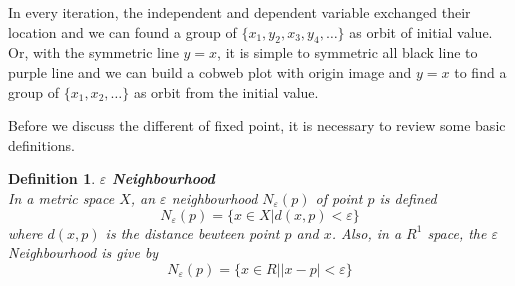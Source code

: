 \documentclass[12pt]{article}
\theoremstyle{plain}
\newtheorem{definition}{\textbf{Definition}}[section]
\begin{document}
In every iteration, the independent and dependent variable exchanged their location and we can found a group of $\{x_1, y_2, x_3, y_4, \ldots\}$ as orbit of initial value. Or, with the symmetric line $y = x$, it is simple to symmetric all black line to purple line and we can build a cobweb plot with origin image and $y = x$ to find a group of $\{x_1, x_2, \ldots\}$ as orbit from the initial value.

Before we discuss the different of fixed point, it is necessary to review some basic definitions.

\begin{definition}\textbf{$\varepsilon$ Neighbourhood}
\\\noindent In a metric space $X$, an $\varepsilon$ neighbourhood $N_\varepsilon(p)$ of point $p$ is defined 
$$
N_\varepsilon(p) = \{x \in X | d(x, p) < \varepsilon\}
$$
where $d(x, p)$ is the distance bewteen point $p$ and $x$. Also, in a $R^1$ space, the $\varepsilon$ Neighbourhood is give by
$$
N_\varepsilon(p) = \{x \in R | |x-p| < \varepsilon\}
$$
\end{definition}


\newpage
\end{document}
